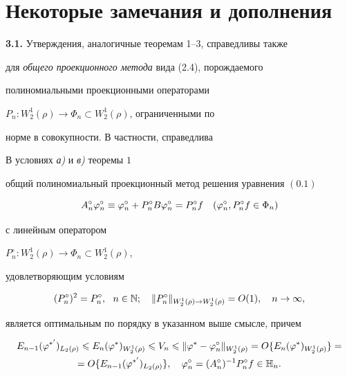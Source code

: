 







\section{Некоторые замечания и дополнения}





{\bf 3.1.} Утверждения, аналогичные теоремам 1--3, справедливы также 


для {\it общего проекционного метода } вида (2.4), порождаемого 


полиномиальными проекционными операторами


$P_n:W_2^1(\rho)\to \Phi_n \subset W_2^1(\rho)$, ограниченными по 


норме в совокупности. В частности, справедлива 





\begin{thm}


В условиях {\em а)} и {\em в)} теоремы $1$ 


общий полиномиальный проекционный метод решения уравнения $(0.1)$ 


\begin{equation}


A_n^\circ \vp_n^\circ \equiv \vp_n^\circ + P_n^\circ B \vp_n^\circ


= P_n^\circ f \quad (\vp_n^\circ, P_n^\circ f\in \Phi_n)


\end{equation}


с линейным оператором


$P_n^\circ:W_2^1(\rho)\to \Phi_n\subset W_2^1(\rho)$, 


удовлетворяющим условиям


\begin{equation}


(P_n^\circ)^2 = P_n^\circ,\ \ n\in \N;


\quad \|P_n^\circ\|_{W_2^1(\rho)\to W_2^1(\rho)} = O(1),\quad n\to \infty,


\end{equation}


является оптимальным по порядку в указанном выше смысле, причем 


\begin{multline}


E_{n-1}(\vp^{*'})_{L_2(\rho)}\lea E_n(\vp^*)_{W_2^1(\rho)}


\lea V_n \lea \|\vp^*-\vp_n^\circ\|_{W_2^1(\rho)}=


O\{E_n(\vp^*)_{W_2^1(\rho)}\}= \\


%


=O\{E_{n-1}(\vp^{*'})_{L_2(\rho)}\},\quad


\vp_n^\circ = (A_n^\circ)^{-1}P_n^\circ f \in \H_n.


\end{multline}


\end{thm}





